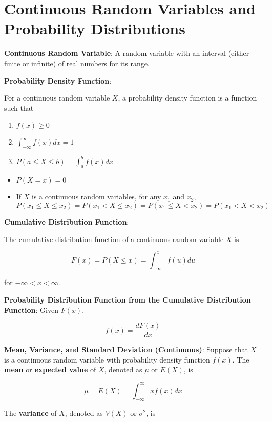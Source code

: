 \documentclass{article}
\begin{document}
\section{Continuous Random Variables and Probability Distributions}

\noindent\textbf{\color{blue}Continuous Random Variable}: A random variable with an interval (either finite or infinite) of real numbers for its range.

\noindent\textbf{\color{blue}Probability Density Function}:

For a continuous random variable $X$, a probability density function is a function such that

\begin{enumerate}
    \item $f(x)\ge0$
    \item $\int_{-\infty}^{\infty}f(x)dx=1$
    \item $P(a\le X\le b)=\int_a^bf(x)dx$
\end{enumerate}

\begin{itemize}

    \item $P(X=x)=0$
    \item If $X$ is a continuous random variables, for any $x_1$ and $x_2$,
\[P(x_1\le X\le x_2)=P(x_1<X\le x_2)=P(x_1\le X<x_2)=P(x_1<X<x_2)\]
\end{itemize}

\noindent\textbf{\color{blue}Cumulative Distribution Function}:

The cumulative distribution function of a continuous random variable $X$ is

\[F(x)=P(X\le x)=\int_{-\infty}^xf(u)du\]

for $-\infty<x<\infty$.

\noindent\textbf{\color{orange}Probability Distribution Function from the Cumulative Distribution Function}: Given $F(x)$,

\[f(x)=\frac{dF(x)}{dx}\]

\noindent\textbf{\color{blue}Mean, Variance, and Standard Deviation (Continuous)}: Suppose that $X$ is a continuous random variable with probability density function $f(x)$. The \textbf{mean} or \textbf{expected value} of $X$, denoted as $\mu$ or $E(X)$, is

\[\mu=E(X)=\int_{-\infty}^{\infty}xf(x)dx\]

The \textbf{variance} of $X$, denoted as $V(X)$ or $\sigma^2$, is
\end{document}

